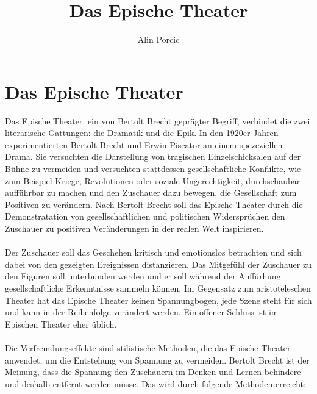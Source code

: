 \documentclass[a4paper]{article}
\title{Das Epische Theater}
\author{Alin Porcic}
\begin{document}
	\maketitle

	\newpage

	\section{Das Epische Theater}

        Das Epische Theater, ein von Bertolt Brecht geprägter Begriff, verbindet die zwei literarische Gattungen: die Dramatik und die Epik. In den 1920er Jahren experimentierten Bertolt Brecht und Erwin Piscator an einem spezeziellen  Drama. Sie versuchten die Darstellung von tragischen Einzelschicksalen auf der Bühne zu vermeiden und versuchten stattdessen gesellschaftliche Konflikte, wie zum Beispiel Kriege, Revolutionen oder soziale Ungerechtigkeit, durchschaubar aufführbar zu machen und den Zuschauer dazu bewegen, die Gesellschaft zum Positiven zu verändern. Nach Bertolt Brecht soll das Epische Theater durch die Demonstratation von gesellschaftlichen und politischen Widersprüchen den Zuschauer zu positiven Veränderungen in der realen Welt inspirieren.\\\\

        Der Zuschauer soll das Geschehen kritisch und emotionslos betrachten und sich dabei von den gezeigten Ereignissen distanzieren. Das Mitgefühl der Zuschauer zu den Figuren soll unterbunden werden und er soll während der Auffürhung gesellschaftliche Erkenntnisse sammeln können. Im Gegensatz zum aristoteleschen Theater hat das Epische Theater keinen Spannungbogen, jede Szene steht für sich und kann in der Reihenfolge verändert werden. Ein offener Schluss ist im Epischen Theater eher üblich.\\\\

	Die Verfremdungseffekte sind stilistische Methoden, die das Epische Theater anwendet, um die Entstehung von Spannung zu vermeiden. Bertolt Brecht ist der Meinung, dass die Spannung den Zuschauern im Denken und Lernen behindere und deshalb entfernt werden müsse. Das wird durch folgende Methoden erreicht:
        
\end{document}
